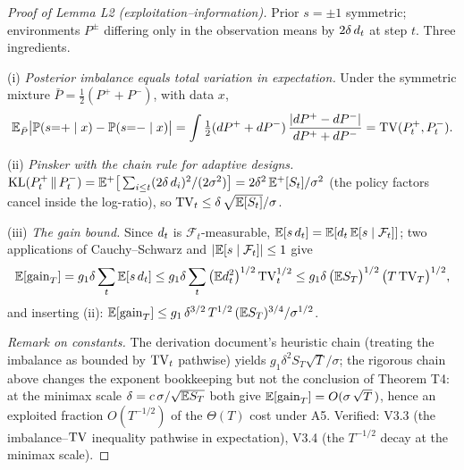 \documentclass[11pt]{article}
\begin{document}
\begin{proof}[Proof of Lemma L2 (exploitation--information)]
Prior $s = \pm 1$ symmetric; environments $P^{\pm}$ differing only in the
observation means by $2\delta\,d_t$ at step $t$. Three ingredients.

(i) \emph{Posterior imbalance equals total variation in expectation.} Under
the symmetric mixture $\bar P = \tfrac{1}{2}(P^+ + P^-)$, with data $x$,
\[
\mathbb{E}_{\bar P}\big|\mathbb{P}(s{=}{+}\mid x) - \mathbb{P}(s{=}{-}\mid x)\big|
 = \int \tfrac{1}{2}(dP^+ + dP^-)\,
   \frac{|dP^+ - dP^-|}{dP^+ + dP^-}
 = \mathrm{TV}(P^+_t, P^-_t).
\]

(ii) \emph{Pinsker with the chain rule for adaptive designs.}
$\mathrm{KL}(P^+_t \,\|\, P^-_t) = \mathbb{E}^{+}\big[\sum_{i\le t}(2\delta\,d_i)^2 /
(2\sigma^2)\big] = 2\delta^2\,\mathbb{E}^{+}[S_t]/\sigma^2$ (the policy factors
cancel inside the log-ratio), so
$\mathrm{TV}_t \le \delta\,\sqrt{\mathbb{E}[S_t]}/\sigma$.

(iii) \emph{The gain bound.} Since $d_t$ is
$\mathcal{F}_t$-measurable, $\mathbb{E}[s\,d_t] = \mathbb{E}[d_t\,\mathbb{E}[s\mid
\mathcal{F}_t]]$; two applications of Cauchy--Schwarz and
$|\mathbb{E}[s\mid\mathcal{F}_t]| \le 1$ give
\[
\mathbb{E}[\mathrm{gain}_T] = g_1\delta\sum_t \mathbb{E}[s\,d_t]
 \le g_1\delta \sum_t \big(\mathbb{E} d_t^2\big)^{1/2}\,\mathrm{TV}_t^{1/2}
 \le g_1\delta\,\big(\mathbb{E} S_T\big)^{1/2}\,\big(T\,\mathrm{TV}_T\big)^{1/2},
\]
and inserting (ii): $\mathbb{E}[\mathrm{gain}_T] \le g_1\,\delta^{3/2}\,
T^{1/2}\,(\mathbb{E} S_T)^{3/4}/\sigma^{1/2}$.

\emph{Remark on constants.} The derivation document's heuristic chain
(treating the imbalance as bounded by $\mathrm{TV}_t$ pathwise) yields
$g_1\delta^2 S_T\sqrt{T}/\sigma$; the rigorous chain above changes the
exponent bookkeeping but not the conclusion of Theorem T4: at the minimax
scale $\delta = c\,\sigma/\sqrt{\mathbb{E} S_T}$ both give
$\mathbb{E}[\mathrm{gain}_T] = O(\sigma\,\sqrt{T}\,)$, hence an exploited fraction
$O(T^{-1/2})$ of the $\Theta(T)$ cost under A5. Verified: V3.3 (the
imbalance--$\mathrm{TV}$ inequality pathwise in expectation), V3.4 (the
$T^{-1/2}$ decay at the minimax scale).
\end{proof}
\end{document}
